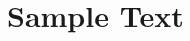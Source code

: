 \documentclass[12pt,a4paper]{report}
\begin{document}


\section*{Sample Text}



\printbibliography
\end{document}
